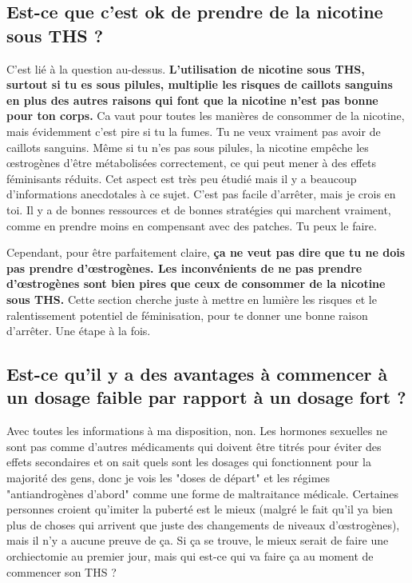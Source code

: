 \documentclass{article}
\begin{document}
\subsection{Est-ce que c'est ok de prendre de la nicotine sous THS ?}\label{11-2}

C'est lié à la question au-dessus. \textbf{L'utilisation de nicotine sous THS, surtout si tu es sous pilules, multiplie les risques de caillots sanguins en plus des autres raisons qui font que la nicotine n'est pas bonne pour ton corps.} Ca vaut pour toutes les manières de consommer de la nicotine, mais évidemment c'est pire si tu la fumes. Tu ne veux vraiment pas avoir de caillots sanguins. Même si tu n'es pas sous pilules, la nicotine empêche les œstrogènes d'être métabolisées correctement, ce qui peut mener à des effets féminisants réduits. Cet aspect est très peu étudié mais il y a beaucoup d'informations anecdotales à ce sujet. C'est pas facile d'arrêter, mais je crois en toi. Il y a de bonnes ressources et de bonnes stratégies qui marchent vraiment, comme en prendre moins en compensant avec des patches. Tu peux le faire.

Cependant, pour être parfaitement claire, \textbf{ça ne veut pas dire que tu ne dois pas prendre d'œstrogènes. Les inconvénients de ne pas prendre d'œstrogènes sont bien pires que ceux de consommer de la nicotine sous THS.} Cette section cherche juste à mettre en lumière les risques et le ralentissement potentiel de féminisation, pour te donner une bonne raison d'arrêter. Une étape à la fois.

\subsection{Est-ce qu'il y a des avantages à commencer à un dosage faible par rapport à un dosage fort ?}

Avec toutes les informations à ma disposition, non. Les hormones sexuelles ne sont pas comme d'autres médicaments qui doivent être titrés pour éviter des effets secondaires et on sait quels sont les dosages qui fonctionnent pour la majorité des gens, donc je vois les "doses de départ" et les régimes "antiandrogènes d'abord" comme une forme de maltraitance médicale. Certaines personnes croient qu'imiter la puberté est le mieux (malgré le fait qu'il ya bien plus de choses qui arrivent que juste des changements de niveaux d'œstrogènes), mais il n'y a aucune preuve de ça. Si ça se trouve, le mieux serait de faire une orchiectomie au premier jour, mais qui est-ce qui va faire ça au moment de commencer son THS ? 
\end{document}
